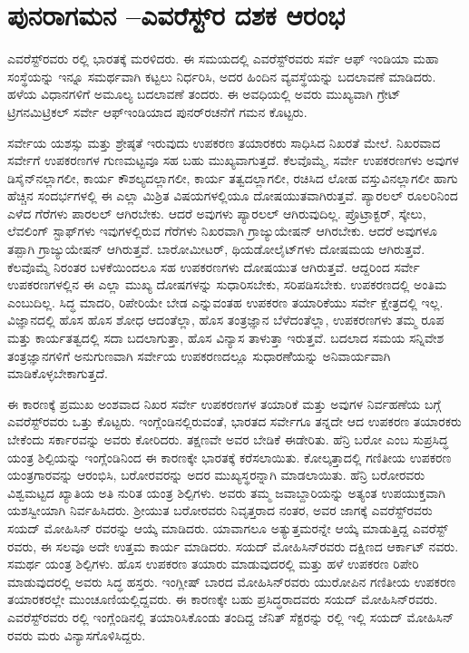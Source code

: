 
\chapter{ಪುನರಾಗಮನ –ಎವರೆಸ್ಟ್​ರ ದಶಕ ಆರಂಭ}

ಎವರೆಸ್ಟ್‌ರವರು ರಲ್ಲಿ ಭಾರತಕ್ಕೆ ಮರಳಿದರು. ಈ ಸಮಯದಲ್ಲಿ ಎವರೆಸ್ಟ್​ರವರು ಸರ್ವೆ ಆಫ್​ ಇಂಡಿಯಾ ಮಹಾ ಸಂಸ್ಥೆಯನ್ನು ಇನ್ನೂ ಸಮರ್ಥವಾಗಿ ಕಟ್ಟಲು ನಿರ್ಧರಿಸಿ, ಅದರ ಹಿಂದಿನ ವ್ಯವಸ್ಥೆಯನ್ನು ಬದಲಾವಣೆ ಮಾಡಿದರು. ಹಳೆಯ ವಿಧಾನಗಳಿಗೆ ಅಮೂಲ್ಯ ಬದಲಾವಣೆ ತಂದರು. ಈ ಅವಧಿಯಲ್ಲಿ ಅವರು ಮುಖ್ಯವಾಗಿ ಗ್ರೇಟ್​ ಟ್ರಿಗನಮಿಟ್ರಿಕಲ್​ ಸರ್ವೇ ಆಫ್​ ಇಂಡಿಯಾದ ಪುನರ್​ರಚನೆಗೆ ಗಮನ ಕೊಟ್ಟರು.

ಸರ್ವೇಯ ಯಶಸ್ಸು ಮತ್ತು ಶ್ರೇಷ್ಠತೆ ಇರುವುದು ಉಪಕರಣ ತಯಾರಕರು ಸಾಧಿಸಿದ ನಿಖರತೆ ಮೇಲೆ. ನಿಖರವಾದ ಸರ್ವೇಗೆ ಉಪಕರಣಗಳ ಗುಣಮಟ್ಟವೂ ಸಹ ಬಹು ಮುಖ್ಯವಾಗುತ್ತದೆ. ಕೆಲವೊಮ್ಮೆ, ಸರ್ವೇ ಉಪಕರಣಗಳು ಅವುಗಳ ಡಿಸೈನ್​ನಲ್ಲಾಗಲೀ, ಕಾರ್ಯ ಕೌಶಲ್ಯದಲ್ಲಾಗಲೀ, ಕಾರ್ಯ ತತ್ವದಲ್ಲಾಗಲೀ, ರಚಿಸಿದ ಲೋಹ ವಸ್ತುವಿನಲ್ಲಾಗಲೀ ಹಾಗು ಹೆಚ್ಚಿನ ಸಂದರ್ಭಗಳಲ್ಲಿ ಈ ಎಲ್ಲಾ ಮಿಶ್ರಿತ ವಿಷಯಗಳಲ್ಲಿಯೂ ದೋಷಯುತವಾಗಿರುತ್ತವೆ. ಪ್ಯಾರಲಲ್​ ರೂಲರಿನಿಂದ ಎಳೆದ ಗೆರೆಗಳು ಪಾರಲಲ್​ ಆಗಿರಬೇಕು. ಆದರೆ ಅವುಗಳು ಪ್ಯಾರಲಲ್​ ಆಗಿರುವುದಿಲ್ಲ. ಪ್ರೊಟ್ರಾಕ್ಟರ್​, ಸ್ಕೇಲು, ಲೆವಲಿಂಗ್​ ಸ್ಟಾಫ್​ಗಳು ಇವುಗಳಲ್ಲಿರುವ ಗೆರೆಗಳು ನಿಖರವಾಗಿ ಗ್ರಾಜ್ಯುಯೇಷನ್​ ಆಗಿರಬೇಕು. ಆದರೆ ಅವುಗಳೂ ತಪ್ಪಾಗಿ ಗ್ರಾಜ್ಯುಯೇಷನ್​ ಆಗಿರುತ್ತವೆ. ಬಾರೋಮೀಟರ್​, ಥಿಯಡೋಲೈಟ್​ಗಳು ದೋಷಮಯ ಆಗಿರುತ್ತವೆ. ಕೆಲವೊಮ್ಮೆ ನಿರಂತರ ಬಳಕೆಯಿಂದಲೂ ಸಹ ಉಪಕರಣಗಳು ದೋಷಯುತ ಆಗಿರುತ್ತವೆ. ಆದ್ದರಿಂದ ಸರ್ವೇ ಉಪಕರಣಗಳಲ್ಲಿನ ಈ ಎಲ್ಲಾ ಮುಖ್ಯ ದೋಷಗಳನ್ನು ಸುಧಾರಿಸಬೇಕು, ಸರಿಪಡಿಸಬೇಕು. ಉಪಕರಣದಲ್ಲಿ ಅಂತಿಮ ಎಂಬುದಿಲ್ಲ. ಸಿದ್ಧ ಮಾದರಿ, ರಿಪೇರಿಯೇ ಬೇಡ ಎನ್ನುವಂತಹ ಉಪಕರಣ ತಯಾರಿಕೆಯು ಸರ್ವೇ ಕ್ಷೇತ್ರದಲ್ಲಿ ಇಲ್ಲ. ವಿಜ್ಞಾನದಲ್ಲಿ ಹೊಸ ಹೊಸ ಶೋಧ ಆದಂತೆಲ್ಲಾ, ಹೊಸ ತಂತ್ರಜ್ಞಾನ ಬೆಳೆದಂತೆಲ್ಲಾ, ಉಪಕರಣಗಳು ತಮ್ಮ ರೂಪ ಮತ್ತು ಕಾರ್ಯತತ್ವದಲ್ಲಿ ಸದಾ ಬದಲಾಗುತ್ತಾ, ಹೊಸ ವಿನ್ಯಾಸ ತಾಳುತ್ತಾ ಇರುತ್ತವೆ. ಬದಲಾದ ಸಮಯ ಸನ್ನಿವೇಶ ತಂತ್ರಜ್ಞಾನಗಳಿಗೆ ಅನುಗುಣವಾಗಿ ಸರ್ವೇಯ ಉಪಕರಣದಲ್ಲೂ ಸುಧಾರಣೆೆಯನ್ನು ಅನಿವಾರ್ಯವಾಗಿ ಮಾಡಿಕೊಳ್ಳಬೇಕಾಗುತ್ತದೆ.

ಈ ಕಾರಣಕ್ಕೆ ಪ್ರಮುಖ ಅಂಶವಾದ ನಿಖರ ಸರ್ವೇ ಉಪಕರಣಗಳ ತಯಾರಿಕೆ ಮತ್ತು ಅವುಗಳ ನಿರ್ವಹಣೆಯ ಬಗ್ಗೆ ಎವರೆಸ್ಟ್​ರವರು ಒತ್ತು ಕೊಟ್ಟರು. ಇಂಗ್ಲೆಂಡಿನಲ್ಲಿರುವಂತೆ, ಭಾರತದ ಸರ್ವೇಗೂ ತನ್ನದೇ ಆದ ಉಪಕರಣ ತಯಾರಕರು ಬೇಕೆಂದು ಸರ್ಕಾರವನ್ನು ಅವರು ಕೋರಿದರು. ತಕ್ಷಣವೇ ಅವರ ಬೇಡಿಕೆ ಈಡೇರಿತು. ಹೆನ್ರಿ ಬರೋ ಎಂಬ ಸುಪ್ರಸಿದ್ಧ ಯಂತ್ರ ಶಿಲ್ಪಿಯನ್ನು ಇಂಗ್ಲೆಂಡಿನಿಂದ ಈ ಕಾರಣಕ್ಕೇ ಭಾರತಕ್ಕೆ ಕರೆಸಲಾಯಿತು. ಕೋಲ್ಕತ್ತಾದಲ್ಲಿ ಗಣಿತೀಯ ಉಪಕರಣ ಯಂತ್ರಗಾರವನ್ನು ಆರಂಭಿಸಿ, ಬರೋರವರನ್ನು ಅದರ ಮುಖ್ಯಸ್ಥರನ್ನಾಗಿ ಮಾಡಲಾಯಿತು. ಹೆನ್ರಿ ಬರೋರವರು ವಿಶ್ವಮಟ್ಟದ ಖ್ಯಾತಿಯ ಅತಿ ನುರಿತ ಯಂತ್ರ ಶಿಲ್ಪಿಗಳು. ಅವರು ತಮ್ಮ ಜವಾಬ್ದಾರಿಯನ್ನು ಅತ್ಯಂತ ಉಪಯುಕ್ತವಾಗಿ ಯಶಸ್ವೀಯಾಗಿ ನಿರ್ವಹಿಸಿದರು. ಶ‍್ರೀಯುತ ಬರೋರವರು ನಿವೃತ್ತರಾದ ನಂತರ, ಅವರ ಜಾಗಕ್ಕೆ ಎವರೆಸ್ಟ್​ರವರು ಸಯದ್​ ಮೋಹಿಸಿನ್​ ರವರನ್ನು ಆಯ್ಕೆ ಮಾಡಿದರು. ಯಾವಾಗಲೂ ಅತ್ಯುತ್ತಮರನ್ನೇ ಆಯ್ಕೆ ಮಾಡುತ್ತಿದ್ದ ಎವರೆಸ್ಟ್​ರವರು, ಈ ಸಲವೂ ಅದೇ ಉತ್ತಮ ಕಾರ್ಯ ಮಾಡಿದರು. ಸಯದ್​ ಮೋಹಿಸಿನ್​ರವರು ದಕ್ಷಿಣದ ಆರ್ಕಾಟ್​ ನವರು. ಸಮರ್ಥ ಯಂತ್ರ ಶಿಲ್ಪಿಗಳು. ಹೊಸ ಉಪಕರಣ ತಯಾರು ಮಾಡುವುದರಲ್ಲಿ ಮತ್ತು ಹಳೆ ಉಪಕರಣ ರಿಪೇರಿ ಮಾಡುವುದರಲ್ಲಿ ಅವರು ಸಿದ್ಧ ಹಸ್ತರು. ಇಂಗ್ಲೀಷ್​ ಬಾರದ ಮೋಹಿಸಿನ್​ರವರು ಯುರೋಪಿನ ಗಣಿತೀಯ ಉಪಕರಣ ತಯಾರಕರಲ್ಲೇ ಮುಂಚೂಣಿಯಲ್ಲಿದ್ದವರು. ಈ ಕಾರಣಕ್ಕೇ ಬಹು ಪ್ರಸಿದ್ಧರಾದವರು ಸಯದ್​ ಮೋಹಿಸಿನ್​ರವರು. ಎವರೆಸ್ಟ್​ ರವರು ರಲ್ಲಿ ಇಂಗ್ಲೆಂಡಿನಲ್ಲಿ ತಯಾರಿಸಿಕೊಂಡು ತಂದಿದ್ದ ಜೆನಿತ್​ ಸೆಕ್ಟರನ್ನು  ರಲ್ಲಿ ಇಲ್ಲಿ ಸಯದ್​ ಮೋಹಿಸಿನ್​ರವರು ಮರು ವಿನ್ಯಾಸಗೊಳಿಸಿದ್ದರು.


